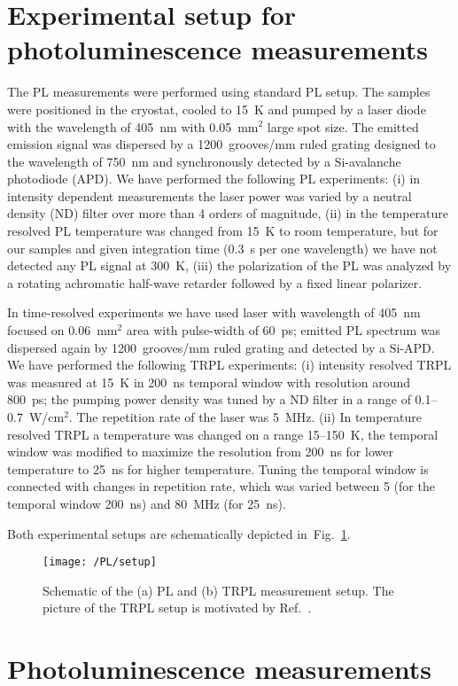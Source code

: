 \section{Experimental setup for photoluminescence measurements}
The PL measurements were performed using standard PL setup. The samples were positioned in the cryostat, cooled to 15~K and pumped by a laser diode with the wavelength of 405~nm with 0.05~mm$^2$ large spot size. The emitted emission signal was dispersed by a 1200~grooves/mm ruled grating designed to the wavelength of 750~nm and synchronously detected by a Si-avalanche photodiode (APD). We have performed the following PL experiments: (i) in intensity dependent measurements the laser power was varied by a neutral density (ND) filter over more than 4 orders of magnitude, (ii) in the temperature resolved PL temperature was changed from 15~K to room temperature, but for our samples and given integration time (0.3~s per one wavelength) we have not detected any PL signal at 300~K, (iii) the polarization of the PL was analyzed by a rotating achromatic half-wave retarder followed by a fixed linear polarizer.

In time-resolved experiments we have used laser with wavelength of 405~nm focused on 0.06~mm$^2$ area with pulse-width of 60~ps; emitted PL spectrum was dispersed again by 1200~grooves/mm ruled grating and detected by a Si-APD. We have performed the following TRPL experiments: (i) intensity resolved TRPL was measured at 15~K in 200~ns temporal window with resolution around 800~ps; the pumping power density was tuned by a ND filter in a range of 0.1--0.7~W/cm$^2$. The repetition rate of the laser was 5~MHz. (ii) In temperature resolved TRPL a temperature was changed on a range 15--150~K, the temporal window was modified to maximize the resolution from 200~ns for lower temperature to 25~ns for higher temperature. Tuning the temporal window is connected with changes in repetition rate, which was varied between 5 (for the temporal window 200~ns) and 80~MHz (for 25~ns).

Both experimental setups are schematically depicted in~Fig.~\ref{fig:Madrid_setup}.
\begin{figure}
	\centering
	\texttt{[image: /PL/setup]}
	\caption{Schematic of the (a) PL and (b) TRPL measurement setup. The picture of the TRPL setup is motivated by Ref.~\citep{TRPL_setup}.}
	\label{fig:Madrid_setup}
\end{figure}


\newpage
\section{Photoluminescence measurements}

